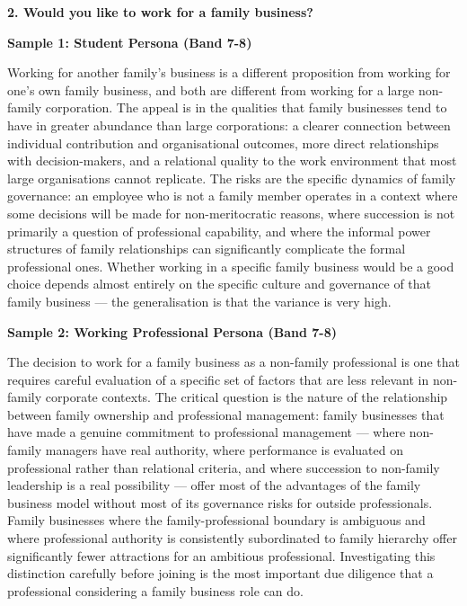\separator

\begin{ieltsquestion}
\textbf{2. Would you like to work for a family business?}
\end{ieltsquestion}
\textbf{Sample 1: Student Persona (Band 7-8)}

Working for another family's business is a different proposition from working for one's own family business, and both are different from working for a large non-family corporation. The appeal is in the qualities that family businesses tend to have in greater abundance than large corporations: a clearer connection between individual contribution and organisational outcomes, more direct relationships with decision-makers, and a relational quality to the work environment that most large organisations cannot replicate. The risks are the specific dynamics of family governance: an employee who is not a family member operates in a context where some decisions will be made for non-meritocratic reasons, where succession is not primarily a question of professional capability, and where the informal power structures of family relationships can significantly complicate the formal professional ones. Whether working in a specific family business would be a good choice depends almost entirely on the specific culture and governance of that family business — the generalisation is that the variance is very high.

\textbf{Sample 2: Working Professional Persona (Band 7-8)}

The decision to work for a family business as a non-family professional is one that requires careful evaluation of a specific set of factors that are less relevant in non-family corporate contexts. The critical question is the nature of the relationship between family ownership and professional management: family businesses that have made a genuine commitment to professional management — where non-family managers have real authority, where performance is evaluated on professional rather than relational criteria, and where succession to non-family leadership is a real possibility — offer most of the advantages of the family business model without most of its governance risks for outside professionals. Family businesses where the family-professional boundary is ambiguous and where professional authority is consistently subordinated to family hierarchy offer significantly fewer attractions for an ambitious professional. Investigating this distinction carefully before joining is the most important due diligence that a professional considering a family business role can do.

